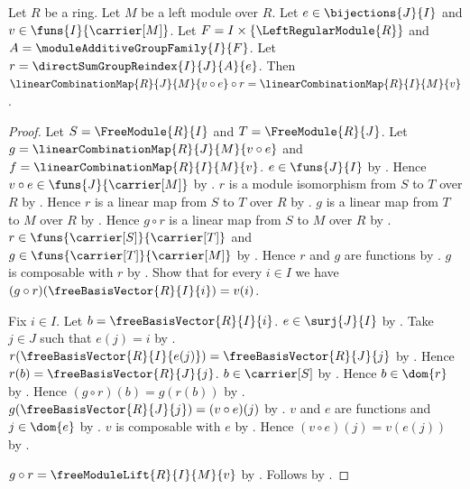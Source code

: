 \begin{theorem}\label{linear_combination_map_reindex}
    Let $R$ be a ring.
    Let $M$ be a left module over $R$.
    Let $e\in\bijections{J}{I}$ and
        $v\in\funs{I}{\carrier[M]}$.
    Let $F=I\times\{\LeftRegularModule{R}\}$ and
        $A=\moduleAdditiveGroupFamily{I}{F}$.
    Let $r=\directSumGroupReindex{I}{J}{A}{e}$.
    Then
        $\linearCombinationMap{R}{J}{M}{v\circ e}\circ r
            =\linearCombinationMap{R}{I}{M}{v}$.
\end{theorem}
\begin{proof}
    Let $S=\FreeModule{R}{I}$ and $T=\FreeModule{R}{J}$.
    Let $g=\linearCombinationMap{R}{J}{M}{v\circ e}$ and
        $f=\linearCombinationMap{R}{I}{M}{v}$.
    $e\in\funs{J}{I}$ by .
    Hence $v\circ e\in\funs{J}{\carrier[M]}$ by
        .
    $r$ is a module isomorphism from $S$ to $T$ over $R$ by
        .
    Hence $r$ is a linear map from $S$ to $T$ over $R$ by
        .
    $g$ is a linear map from $T$ to $M$ over $R$ by
        .
    Hence $g\circ r$ is a linear map from $S$ to $M$ over $R$ by
        .
    $r\in\funs{\carrier[S]}{\carrier[T]}$ and
        $g\in\funs{\carrier[T]}{\carrier[M]}$ by
        .
    Hence $r$ and $g$ are functions by .
    $g$ is composable with $r$ by .
    Show that for every $i\in I$ we have
        $(g\circ r)(\freeBasisVector{R}{I}{i})=v(i)$.
    \begin{subproof}
        Fix $i\in I$.
        Let $b=\freeBasisVector{R}{I}{i}$.
        $e\in\surj{J}{I}$ by .
        Take $j\in J$ such that $e(j)=i$ by .
        $r(\freeBasisVector{R}{I}{e(j)})
            =\freeBasisVector{R}{J}{j}$ by
            .
        Hence $r(b)
            =\freeBasisVector{R}{J}{j}$.
        $b\in\carrier[S]$ by
            .
        Hence $b\in\dom{r}$ by .
        Hence $(g\circ r)(b)=g(r(b))$ by .
        $g(\freeBasisVector{R}{J}{j})=(v\circ e)(j)$ by
            .
        $v$ and $e$ are functions and $j\in\dom{e}$ by
            .
        $v$ is composable with $e$ by .
        Hence $(v\circ e)(j)=v(e(j))$ by .
    \end{subproof}
    $g\circ r=\freeModuleLift{R}{I}{M}{v}$ by
        .
    Follows by .
\end{proof}

